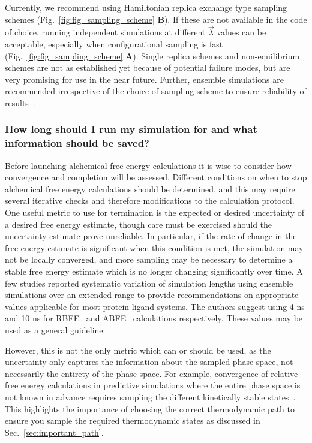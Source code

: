 \documentclass[9pt,bestpractices]{livecoms}
\begin{document}
Currently, we recommend using Hamiltonian replica exchange type sampling schemes (Fig.~\ref{fig:fig_sampling_scheme} \textbf{B}). If these are not available in the code of choice, running independent simulations at different $\vec{\lambda}$ values can be acceptable, especially when configurational sampling is fast (Fig.~\ref{fig:fig_sampling_scheme} \textbf{A}). Single replica schemes and non-equilibrium schemes are not as established yet because of potential failure modes, but are very promising for use in the near future. 
Further, ensemble simulations are recommended irrespective of the choice of sampling scheme to ensure reliability of results~\cite{bhati2018, bhati2019, wan2020fep+, wade2022, wan2021uq, bhati2025, wan2023eqvsneq}.


\subsubsection{How long should I run my simulation for and what information should be saved?}
\label{sec:sim_length_information_kept}
Before launching alchemical free energy calculations it is wise to consider how convergence and completion will be assessed. Different conditions on when to stop alchemical free energy calculations should be determined, and this may require several iterative checks and therefore modifications to the calculation protocol.
One useful metric to use for termination is the expected or desired uncertainty of a desired free energy estimate, though care must be exercised should the uncertainty estimate prove unreliable.
In particular, if the rate of change in the free energy estimate is significant when this condition is met, the simulation may not be locally converged, and more sampling may be necessary to determine a stable free energy estimate which is no longer changing significantly over time. 
A few studies reported systematic variation of simulation lengths using ensemble simulations over an extended range to provide recommendations on appropriate values applicable for most protein-ligand systems. The authors suggest using 4 ns and 10 ns for RBFE~\cite{bhati2017, bhati2022, wan2023eqvsneq} and ABFE~\cite{bhati2025} calculations respectively. These values may be used as a general guideline.

However, this is not the only metric which can or should be used, as the uncertainty only captures the information about the sampled phase space, not necessarily the entirety of the phase space.  
For example, convergence of relative free energy calculations in predictive simulations where the entire phase space is not known in advance requires sampling the different kinetically stable states~\cite{mobley2012perspective}. 
This highlights the importance of choosing the correct thermodynamic path to ensure you sample the required thermodynamic states as discussed in Sec.~\ref{sec:important_path}.
\end{document}
